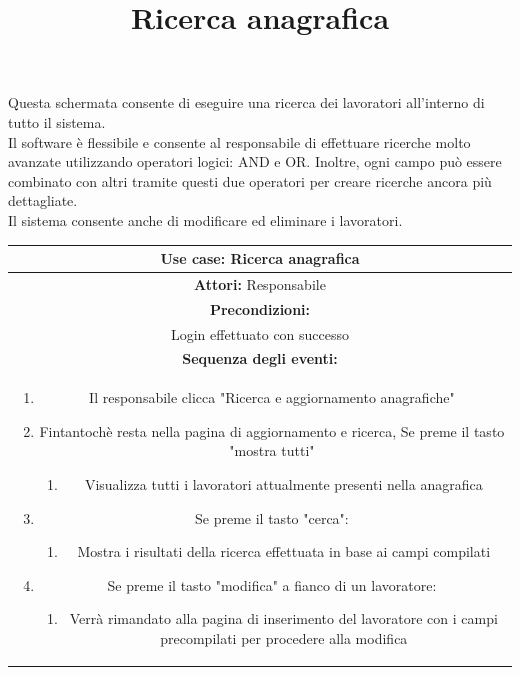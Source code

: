 \documentclass[a4paper,11pt]{article}
\begin{document}
\newpage
\begin{center}
	\title{\textbf{Ricerca anagrafica}}
	\maketitle
\end{center}
Questa schermata consente di eseguire una ricerca dei lavoratori all'interno di tutto il sistema.\\
Il software è flessibile e consente al responsabile di effettuare ricerche molto avanzate utilizzando operatori logici: AND e OR. Inoltre, ogni campo può essere combinato con altri tramite questi due operatori per creare ricerche ancora più dettagliate.\\
Il sistema consente anche di modificare ed eliminare i lavoratori.
\begin{center}
	\begin{tabular}{|c|}
		\hline
		\textbf{Use case: Ricerca anagrafica}\\
		\hline	
		\textbf{Attori:} Responsabile\\
		\hline
		\textbf{Precondizioni:}\\ Login effettuato con successo\\
		\hline
		\textbf{Sequenza degli eventi:}\\
		\begin{minipage}{5in}
			\begin{enumerate}
				\item Il responsabile clicca "Ricerca e aggiornamento anagrafiche"
				\item Fintantochè resta nella pagina di aggiornamento e ricerca, Se preme il tasto "mostra tutti"
				\begin{enumerate}
					\item Visualizza tutti i lavoratori attualmente presenti nella anagrafica
				\end{enumerate}
				\item Se preme il tasto "cerca":
				\begin{enumerate}
					\item Mostra i risultati della ricerca effettuata in base ai campi compilati
				\end{enumerate}
				\item Se preme il tasto "modifica" a fianco di un lavoratore:
				\begin{enumerate}
					\item Verrà rimandato alla pagina di inserimento del lavoratore con i campi precompilati per procedere alla modifica

\end{enumerate}
\end{enumerate}
\end{minipage}
\end{tabular}
\end{center}
\end{document}
